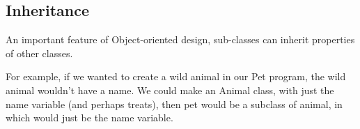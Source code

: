 		
	
	\ifprint
	\else
		\subsection*{Inheritance}
		
			An important feature of Object-oriented design, sub-classes can inherit properties of other classes.
			
			For example, if we wanted to create a wild animal in our Pet program, the wild animal wouldn't have a name. We could make an Animal class, with just the name variable (and perhaps treats), then pet would be a subclass of animal, in which would just be the name variable.
			
			
	\fi